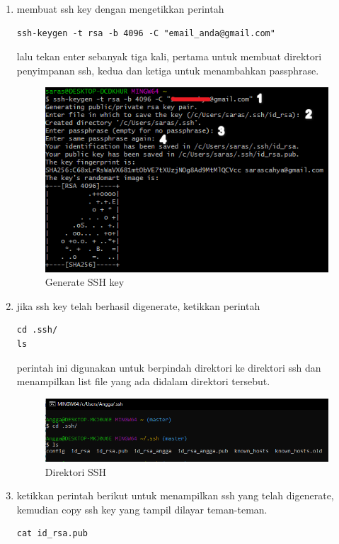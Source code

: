 \begin{enumerate}
\item membuat ssh key dengan mengetikkan perintah
\begin{verbatim}
ssh-keygen -t rsa -b 4096 -C "email_anda@gmail.com"
\end{verbatim}
lalu tekan enter sebanyak tiga kali, pertama untuk membuat direktori penyimpanan ssh, kedua dan ketiga untuk menambahkan passphrase.
\begin{figure}[H]
\centering
\includegraphics[scale=.75]{figures/konfig_git3}
\caption{Generate SSH key}
\label{konfig_git3}
\end{figure}

\item jika ssh key telah berhasil digenerate, ketikkan perintah
\begin{verbatim}
cd .ssh/
ls
\end{verbatim}
perintah ini digunakan untuk berpindah direktori ke direktori ssh dan menampilkan list file yang ada didalam direktori tersebut.
\begin{figure}[H]
\centering
\includegraphics[scale=.5]{figures/konfig_git4}
\caption{Direktori SSH}
\label{konfig_git4}
\end{figure}

\item ketikkan perintah berikut untuk menampilkan ssh yang telah digenerate, kemudian copy ssh key yang tampil dilayar teman-teman.
\begin{verbatim}
cat id_rsa.pub
\end{verbatim}


\end{enumerate}
